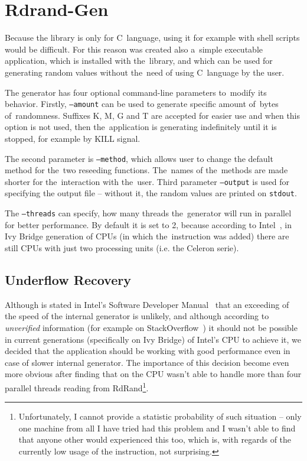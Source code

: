 
\chapter{Rdrand-Gen} \label{chap:generator}
\par{
Because the library is only for C~language, using it for example with shell scripts would be difficult. For this reason was created also a~simple executable application, which is installed with the~library, and which can be used for generating random values without the~need of using C~language by the user.
}

\par{
The generator has four optional command-line parameters to~modify its behavior. Firstly, {\tt --amount} can be used to generate specific amount of~bytes of~randomness. Suffixes K, M, G and T are accepted for easier use and when this option is not used, then the~application is generating indefinitely until it is stopped, for example by KILL signal.
}

\par{
The second parameter is {\tt --method}, which allows user to change the default method  for the~two reseeding functions. The~names of the~methods are made shorter for the~interaction with the~user. Third parameter {\tt --output} is used for specifying the output file -- without it, the random values are printed on {\tt stdout}. 
}

\par{
The {\tt --threads} can specify, how many threads the~generator will run in parallel for better performance. By default it is set to 2, because according to Intel~\cite{IntelArk}, in Ivy Bridge generation of CPUs (in which the~instruction was added) there are still CPUs with just two processing units (i.e. the Celeron serie).
}

\section{Underflow Recovery}
\par{
Although is stated in Intel's Software Developer Manual~\cite[chapter~7.3.17]{IntelSWManualVol1} that an exceeding of the speed of the internal generator is unlikely, and although according to {\em unverified} information (for example on StackOverflow~\cite{StackoverflowRDRANDCharacteristics}) it should not be possible in current generations (specifically on Ivy Bridge) of Intel's CPU to achieve it, we decided that the application should be working with good performance even in case of slower internal generator. The importance of this decision become even more obvious after finding that on  the CPU wasn't able to handle more than four parallel threads reading from RdRand\footnote{Unfortunately, I cannot provide a statistic probability of such situation -- only one machine from all I have tried had this problem and I wasn't able to find that anyone other would experienced this too, which is, with regards of the currently low usage of the instruction, not surprising.}.
}

